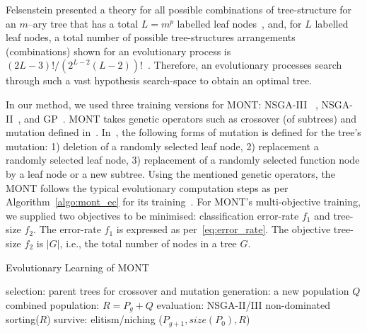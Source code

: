 \documentclass[conference]{IEEEtran}
\begin{document}
Felsenstein presented a theory for all possible combinations of tree-structure for an $ m $--ary tree that has a total $ L = m^p $ labelled leaf nodes~\cite{felsenstein1978number}, and, for $ L $ labelled leaf nodes, a total number of possible tree-structures arrangements (combinations) shown for an evolutionary process is $ (2L - 3)!/(2^{L-2}(L-2))!$~\cite{felsenstein1978number}. Therefore, an evolutionary processes search through such a vast hypothesis search-space to obtain an optimal tree.

In our method, we used three training versions for MONT: NSGA-III~
\cite{deb2013evolutionary}, NSGA-II~\cite{deb2000fast}, and GP~\cite{schmidt2009solving}. MONT takes genetic operators such as crossover (of subtrees)  and mutation defined in~\cite{ojha2017ensemble}. In~\cite{ojha2017ensemble}, the following forms of mutation is defined for the tree's mutation: 1) deletion of a randomly selected leaf node, 2) replacement a randomly selected leaf node, 3) replacement of a randomly selected function node by a leaf node or a new subtree. Using the mentioned genetic operators, the MONT follows the typical evolutionary computation steps as per Algorithm~\ref{algo:mont_ec} for its training~\cite{goldberg1989genetic}. For MONT's multi-objective training, we supplied two objectives to be minimised: classification  error-rate $ f_1 $ and tree-size $ f_2 $. The error-rate $ f_1 $ is expressed as per~\eqref{eq:error_rate}. The objective tree-size $ f_2$ is $|G|$, i.e.,  the total number of nodes in a tree $ G $.
\begin{algorithm}
    \caption{Evolutionary Learning of MONT}
    \label{algo:mont_ec}
    \begin{algorithmic}[1]
        \Statex
        \State selection: parent trees for crossover and mutation
        \State generation: a new population $ Q $
        \State combined population: $ R = P_g + Q $
        \State evaluation: NSGA-II/III non-dominated sorting($ R $)
        \State survive: elitism/niching ($ P_{g+1}, size(P_0), R $)
        \EndWhile
        \State {}
        \EndFunction
    \end{algorithmic}
\end{algorithm}
\end{document}
